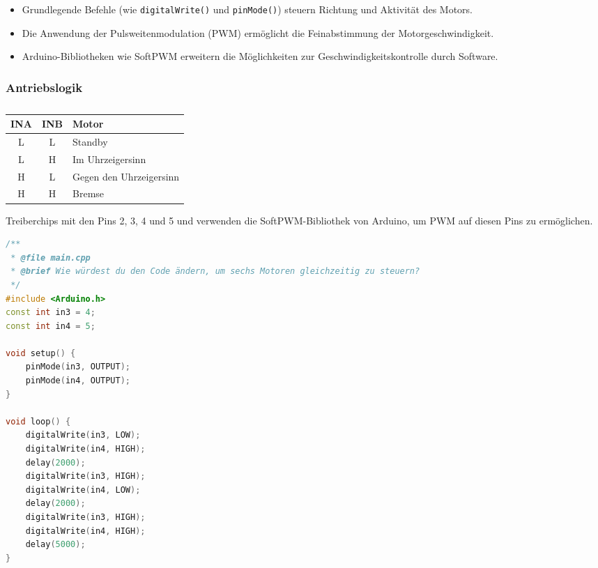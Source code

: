 \documentclass{vorlage-design-main}
\begin{document}
\begin{itemize}
  \begin{itemize}
  
  \item
    Grundlegende Befehle (wie \verb|digitalWrite()|
    und \verb|pinMode()|) steuern Richtung und
    Aktivität des Motors.
  \item
    Die Anwendung der Pulsweitenmodulation (PWM) ermöglicht die
    Feinabstimmung der Motorgeschwindigkeit.
  \item
    Arduino-Bibliotheken wie SoftPWM erweitern die Möglichkeiten zur
    Geschwindigkeitskontrolle durch Software.
  \end{itemize}
\end{itemize}

\hypertarget{antriebslogik}{%
\subsubsection{Antriebslogik}\label{antriebslogik}}

\begin{table}[!ht]
\caption{}%
\begin{tabular}{@{}ccl@{}}

\toprule
INA & INB & Motor \\
\midrule[\heavyrulewidth]

L & L & Standby \\
L & H & Im Uhrzeigersinn \\
H & L & Gegen den Uhrzeigersinn \\
H & H & Bremse \\
\bottomrule

\end{tabular}
\floatnotes{}
\end{table}

Treiberchips mit den Pins 2, 3, 4 und 5 und verwenden die
SoftPWM-Bibliothek von Arduino, um PWM auf diesen Pins zu ermöglichen.

\begin{lstlisting}[language={C++}]
/**
 * @file main.cpp
 * @brief Wie würdest du den Code ändern, um sechs Motoren gleichzeitig zu steuern?
 */
#include <Arduino.h>
const int in3 = 4;
const int in4 = 5;

void setup() {
    pinMode(in3, OUTPUT);
    pinMode(in4, OUTPUT);
}

void loop() {
    digitalWrite(in3, LOW);
    digitalWrite(in4, HIGH);
    delay(2000);
    digitalWrite(in3, HIGH);
    digitalWrite(in4, LOW);
    delay(2000);
    digitalWrite(in3, HIGH);
    digitalWrite(in4, HIGH);
    delay(5000);
}
\end{lstlisting}
\end{document}
